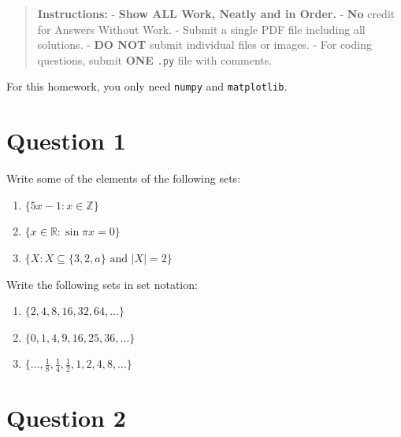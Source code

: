\documentclass[
  letterpaper,
  DIV=11,
  numbers=noendperiod]{scrreprt}
\providecommand{\tightlist}{%
  \setlength{\itemsep}{0pt}\setlength{\parskip}{0pt}}\usepackage{longtable,booktabs,array}
\begin{document}
\begin{quote}
\textbf{Instructions:} - \textbf{Show ALL Work, Neatly and in Order.} -
\textbf{No} credit for Answers Without Work. - Submit a single PDF file
including all solutions. - \textbf{DO NOT} submit individual files or
images. - For coding questions, submit \textbf{ONE} \texttt{.py} file
with comments.
\end{quote}

\begin{tcolorbox}[enhanced jigsaw, opacityback=0, left=2mm, breakable, bottomtitle=1mm, rightrule=.15mm, colframe=quarto-callout-note-color-frame, titlerule=0mm, colback=white, opacitybacktitle=0.6, toptitle=1mm, title=\textcolor{quarto-callout-note-color}{\faInfo}\hspace{0.5em}{Note}, colbacktitle=quarto-callout-note-color!10!white, bottomrule=.15mm, arc=.35mm, coltitle=black, leftrule=.75mm, toprule=.15mm]

For this homework, you only need \texttt{numpy} and \texttt{matplotlib}.

\end{tcolorbox}

\section{Question 1}\label{question-1}

Write some of the elements of the following sets:

\begin{enumerate}
\def\labelenumi{\arabic{enumi}.}
\tightlist
\item
  \(\{ 5x-1: x \in \mathbb{Z} \}\)
\item
  \(\{ x \in \mathbb{R}: \sin \pi x = 0 \}\)
\item
  \(\{X : X \subseteq \{3,2,a\} \text{ and } |X|=2 \}\)
\end{enumerate}

Write the following sets in set notation:

\begin{enumerate}
\def\labelenumi{\arabic{enumi}.}
\setcounter{enumi}{3}
\tightlist
\item
  \(\{ 2, 4, 8, 16, 32, 64, ...\}\)
\item
  \(\{0,1,4,9,16,25,36, ...\}\)
\item
  \(\{..., \frac{1}{8},\frac{1}{4},\frac{1}{2},1,2,4,8,... \}\)
\end{enumerate}

\section{Question 2}\label{question-2}
\end{document}
